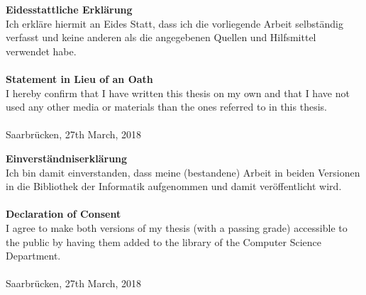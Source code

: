 \textbf{Eidesstattliche Erklärung}
\\

Ich erkläre hiermit an Eides Statt, dass ich die vorliegende Arbeit selbständig verfasst und keine anderen als die angegebenen Quellen und Hilfsmittel verwendet habe.
\\\\

\textbf{Statement in Lieu of an Oath}
\\

I hereby confirm that I have written this thesis on my own and that I have not
used any other media or materials than the ones referred to in this thesis.
\\\\

Saarbrücken, 27th March, 2018

\vspace{5cm}

\textbf{Einverständniserklärung}
\\

Ich bin damit einverstanden, dass meine (bestandene) Arbeit in beiden Versionen
in die Bibliothek der Informatik aufgenommen und damit veröffentlicht wird.
\\\\

\textbf{Declaration of Consent}
\\

I agree to make both versions of my thesis (with a passing grade) accessible to the
public by having them added to the library of the Computer Science Department.
\\\\

Saarbrücken, 27th March, 2018